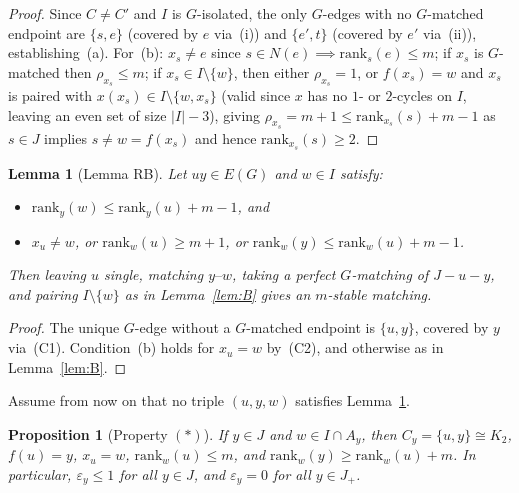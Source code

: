 \documentclass[11pt]{article}
\newtheorem{lemma}[theorem]{Lemma}
\newtheorem{proposition}[theorem]{Proposition}
\begin{document}
\begin{proof}
Since $C \neq C'$ and $I$ is $G$-isolated, the only $G$-edges with no $G$-matched endpoint are $\{s,e\}$ (covered by $e$ via~(i)) and $\{e',t\}$ (covered by $e'$ via~(ii)), establishing~(a). For~(b): $x_s \neq e$ since $s \in N(e) \implies \mathrm{rank}_s(e) \le m$; if $x_s$ is $G$-matched then $\rho_{x_s} \le m$; if $x_s \in I \setminus \{w\}$, then either $\rho_{x_s} = 1$, or $f(x_s) = w$ and $x_s$ is paired with $x(x_s) \in I \setminus \{w, x_s\}$ (valid since $x$ has no $1$- or $2$-cycles on $I$, leaving an even set of size $|I|-3$), giving $\rho_{x_s} = m+1 \le \mathrm{rank}_{x_s}(s) + m - 1$ as $s \in J$ implies $s \neq w = f(x_s)$ and hence $\mathrm{rank}_{x_s}(s) \ge 2$.
\end{proof}

\begin{lemma}[Lemma RB]\label{lem:RB}
Let $uy \in E(G)$ and $w \in I$ satisfy:
\begin{itemize}
  \item[\emph{(C1)}] $\mathrm{rank}_y(w) \le \mathrm{rank}_y(u) + m - 1$, and
  \item[\emph{(C2)}] $x_u \neq w$, or $\mathrm{rank}_w(u) \ge m+1$, or $\mathrm{rank}_w(y) \le \mathrm{rank}_w(u) + m - 1$.
\end{itemize}
Then leaving $u$ single, matching $y\text{--}w$, taking a perfect $G$-matching of $J-u-y$, and pairing $I \setminus \{w\}$ as in Lemma~\ref{lem:B} gives an $m$-stable matching.
\end{lemma}

\begin{proof}
The unique $G$-edge without a $G$-matched endpoint is $\{u,y\}$, covered by $y$ via~(C1). Condition~(b) holds for $x_u = w$ by~(C2), and otherwise as in Lemma~\ref{lem:B}.
\end{proof}

Assume from now on that no triple $(u,y,w)$ satisfies Lemma~\ref{lem:RB}.

\begin{proposition}[Property $(\ast)$]\label{prop:star}
If $y \in J$ and $w \in I \cap A_y$, then $C_y = \{u,y\} \cong K_2$, $f(u) = y$, $x_u = w$, $\mathrm{rank}_w(u) \le m$, and $\mathrm{rank}_w(y) \ge \mathrm{rank}_w(u) + m$. In particular, $\varepsilon_y \le 1$ for all $y \in J$, and $\varepsilon_y = 0$ for all $y \in J_+$.
\end{proposition}
\end{document}
